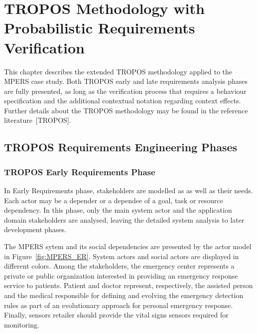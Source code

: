 \chapter{TROPOS Methodology with Probabilistic Requirements Verification}\label{ch:proposal}

This chapter describes the extended TROPOS methodology applied to the MPERS case study. Both TROPOS early and late requirements analysis phases are fully presented, as long as the verification process that requires a behaviour specification and the additional contextual notation regarding context effects. Further details about the TROPOS methodology may be found in the reference literature~[TROPOS]. 

\section{TROPOS Requirements Engineering Phases}

\subsection{TROPOS Early Requirements Phase}

In Early Requirements phase, stakeholders are modelled as as well as their needs. Each actor may be a depender or a dependee of a goal, task or resource dependency. In this phase, only the main system actor and the application domain stakeholders are analysed, leaving the detailed system analysis to later development phases.

The MPERS sytem and its social dependencies are presented by the actor model in Figure~\ref{fig:MPERS_ER}. System actors and social actors are displayed in different colors. Among the stakeholders, the emergency center represents a private or public organization interested in providing an emergency response service to patients. Patient and doctor represent, respectively, the assisted person and the medical responsible for defining and evolving the emergency detection rules as part of an evolutionary approach for personal emergency response. Finally, sensors retailer should provide the vital signs sensors required for monitoring.

